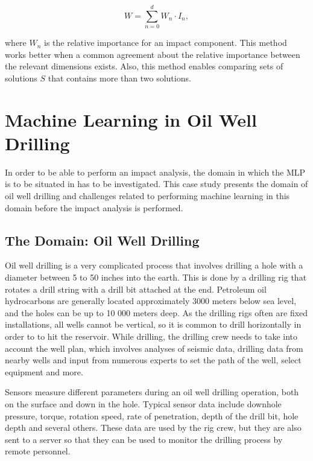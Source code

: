 \documentclass{article}
\theoremstyle{theorem}
\theoremstyle{definition}
\begin{document}
\begin{equation}
W = \sum_{n=0}^d W_n \cdot I_n,
\end{equation}

where $W_n$ is the relative importance for an impact component. This method works better when a common agreement about the relative importance between the relevant dimensions exists.
Also, this method enables comparing sets of solutions $S$ that contains more than two solutions.

\section{Machine Learning in Oil Well Drilling}
\label{sec:case_study:oil_well_drilling}
In order to be able to perform an impact analysis, the domain in which the MLP is to be situated in has to be investigated.
This case study presents the domain of oil well drilling and challenges related to performing machine learning in this domain before the impact analysis is performed.


\subsection{The Domain: Oil Well Drilling}
Oil well drilling is a very complicated process that involves drilling a hole with a diameter between 5 to 50 inches into the earth.
This is done by a drilling rig that rotates a drill string with a drill bit attached at the end. 
Petroleum oil hydrocarbons are generally located approximately 3000 meters below sea level, and the holes can be up to 10 000 meters deep. 
As the drilling rigs often are fixed installations, all wells cannot be vertical, so it is common to drill horizontally in order to to hit the reservoir. 
While drilling, the drilling crew needs to take into account the well plan, which involves analyses of seismic data, drilling data from nearby wells  and input from numerous experts to set the path of the well, select equipment and more. 

Sensors measure different parameters during an oil well drilling operation, both on the surface and down in the hole.
Typical sensor data include downhole pressure, torque, rotation speed, rate of penetration, depth of the drill bit, hole depth and several others.
These data are used by the rig crew, but they are also sent to a server so that they can be used to monitor the drilling process by remote personnel.
\end{document}
